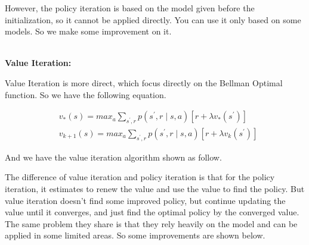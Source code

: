 \documentclass[a4paper,12pt]{article}
\newenvironment{Algorithm}[1][]{\def\algoname{#1}\bigskip\begin{algorithm}}{\caption{\algoname}\end{algorithm}}
\begin{document}
However, the policy iteration is based on the model given before the initialization, so it cannot be applied directly. You can use it only based on some models. So we make some improvement on it.


~\\

\textbf{Value Iteration:}

Value Iteration is more direct, which focus directly on the Bellman Optimal function. So we have the following equation.

\begin{align*}
&v_{*}(s) = max_{a} \sum_{s^{'},r} p(s^{'},r \mid s,a)[r + \lambda v_{*}(s^{'})]\\
&v_{k+1}(s) = max_{a} \sum_{s^{'},r} p(s^{'},r \mid s,a)[r + \lambda v_{k}(s^{'})]
\end{align*}

And we have the value iteration algorithm shown as follow.

\begin{Algorithm}[Value Iteration][H]


\end{Algorithm}

The difference of value iteration and policy iteration is that for the policy iteration, it estimates to renew the value and use the value to find the policy. But value iteration doesn't find some improved policy, but continue updating the value until it converges, and just find the optimal policy by the converged value. The same problem they share is that they rely heavily on the model and can be applied in some limited areas. So some improvements are shown below.
~\\
\end{document}
